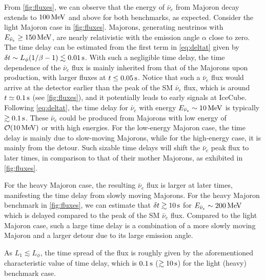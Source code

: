 \documentclass[aps,twocolumn,prl,showpacs,showkeys,preprintnumbers,superscriptaddress,nobibnotes,floatfix,longbibliography,notitlepage,nofootinbib]{revtex4-2}
\begin{document}
From \cref{fig:fluxes}, we can observe that the energy of $\bar{\nu}_e$ from Majoron decay extends to $\unit[100]{MeV}$ and above for both benchmarks, as expected. 
Consider the light Majoron case in \cref{fig:fluxes}.
Majorons, generating neutrinos with $E_{\bar{\nu}_e} \geq \unit[150]{MeV}$, are nearly relativistic with the emission angle $\alpha$ close to zero.
The time delay can be estimated from the first term in \cref{eq:deltat} given by $\delta t \sim L_\phi (1/\beta -1)\lesssim \unit[0.01]{s}$.
With such a negligible time delay, the time dependence of the $\bar{\nu}_e$ flux is mainly inherited from that of the Majorons upon production, with larger fluxes at $t\leq \unit[0.05]{s}$.
Notice that such a $\bar{\nu}_e$ flux would arrive at the detector earlier than the peak of the SM $\bar{\nu}_e$ flux, which is around $t\simeq \unit[0.1]{s}$ (see \cref{fig:fluxes}), and it potentially leads to early signals at IceCube.
Following \cref{eq:deltat}, the time delay for $\bar{\nu}_e$ with energy $E_{\bar{\nu}_{e}} \sim \unit[10]{MeV}$ is typically $\gtrsim \unit[0.1]{s}$.
These $\bar{\nu}_e$ could be produced from Majorons with low energy of $\mathcal{O}(\unit[10]{MeV})$ or with high energies.
For the low-energy Majoron case, the time delay is mainly due to slow-moving Majorons, while for the high-energy case, it is mainly from the detour.
Such sizable time delays will shift the $\bar{\nu}_e$ peak flux to later times, in comparison to that of their mother Majorons, as exhibited in \cref{fig:fluxes}.



For the heavy Majoron case, the resulting $\bar{\nu}_e$ flux is larger at later times, manifesting the time delay from slowly moving Majorons.
For the heavy Majoron benchmark in \cref{fig:fluxes}, we can estimate that $\delta t \gtrsim \unit[10]{s}$ for $E_{\bar{\nu}_{e}}\sim \unit[200]{MeV}$ which is delayed compared to the peak of the SM $\bar{\nu}_e$ flux.
Compared to the light Majoron case, such a large time delay is a combination of a more slowly moving Majoron and a larger detour due to its large emission angle.

As $L_1\lesssim L_\phi$, the time spread of the flux is roughly given by the aforementioned characteristic value of time delay, which is $\unit[0.1]{s}$ ($\gtrsim\unit[10]{s}$) for the light (heavy) benchmark case.
\end{document}

